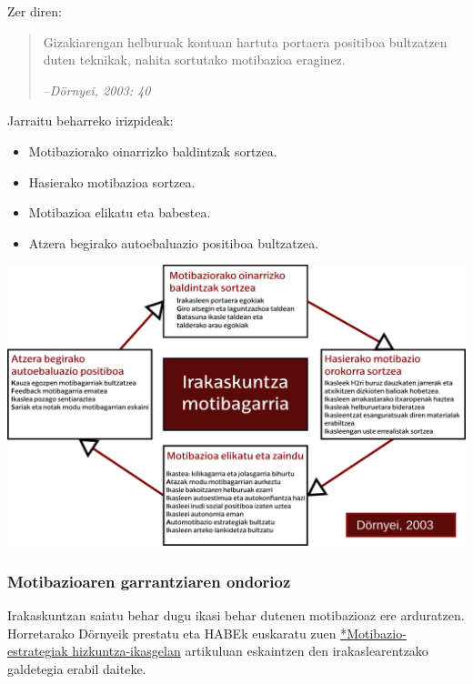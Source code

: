 \documentclass[]{book}
\providecommand{\tightlist}{%
  \setlength{\itemsep}{0pt}\setlength{\parskip}{0pt}}
\begin{document}
Zer diren:

\begin{quote}
Gizakiarengan helburuak kontuan hartuta portaera positiboa bultzatzen duten teknikak, nahita sortutako motibazioa eraginez.

--\emph{Dörnyei, 2003: 40}
\end{quote}

Jarraitu beharreko irizpideak:

\begin{itemize}
\tightlist
\item
  Motibaziorako oinarrizko baldintzak sortzea.
\item
  Hasierako motibazioa sortzea.
\item
  Motibazioa elikatu eta babestea.
\item
  Atzera begirako autoebaluazio positiboa bultzatzea.
\end{itemize}

\includegraphics{assets/06-01_Irakaskuntza motibagarria.png}

\hypertarget{motibazioaren-garrantziaren-ondorioz}{%
\subsubsection{Motibazioaren garrantziaren ondorioz}\label{motibazioaren-garrantziaren-ondorioz}}

Irakaskuntzan saiatu behar dugu ikasi behar dutenen motibazioaz ere arduratzen. Horretarako Dörnyeik prestatu eta HABEk euskaratu zuen \href{https://b08normalkuntza.wikispaces.com/file/view/MOTIBAZIO+ESTRAT.pdf}{*Motibazio-estrategiak hizkuntza-ikasgelan} artikuluan eskaintzen den irakaslearentzako galdetegia erabil daiteke.
\end{document}
